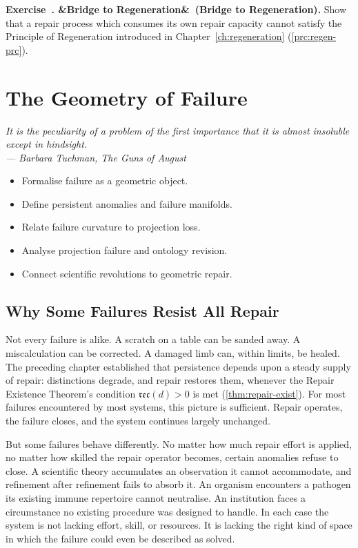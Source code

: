 \documentclass[12pt,twoside,openright]{book}
\newcommand{\reco}{\mathfrak{rec}}
\newenvironment{epigraph}[2]{%
  \vspace{1em}\begin{flushright}
  \begin{minipage}{0.72\textwidth}
  \itshape\small #1\\[0.4em]
  \upshape\footnotesize\sffamily\color{DistGray}--- #2
  \end{minipage}\end{flushright}\vspace{1.5em}}{}
\newenvironment{objectives}{%
  \begin{tcolorbox}[colback=DistBlue!5,colframe=DistBlue,
    title={\faCheckCircle\enspace Learning Objectives},
    fonttitle=\sffamily\bfseries\color{white},
    attach boxed title to top left={yshift=-2mm,xshift=4mm},
    boxed title style={colback=DistBlue},breakable]
  \begin{itemize}[leftmargin=*,nosep]}{%
  \end{itemize}\end{tcolorbox}\vspace{1em}}
\newcounter{exercise}[chapter]
\newenvironment{exercise}[1][]{%
  \refstepcounter{exercise}%
  \noindent\textbf{\sffamily\color{DistBlue}%
  Exercise~\thechapter.\theexercise%
  \ifx&#1&\else~(#1)\fi.}\enspace}{\par\medskip}
\begin{document}
\begin{exercise}[Bridge to Regeneration]
  Show that a repair process which consumes its own repair
  capacity cannot satisfy the Principle of Regeneration
  introduced in Chapter~\ref{ch:regeneration}
  (\cref{prc:regen-prc}).
\end{exercise}

\chapter{The Geometry of Failure}
\label{ch:geometry-failure}
\begin{epigraph}{It is the peculiarity of a problem of the
  first importance that it is almost insoluble except in
  hindsight.}%
  {Barbara Tuchman, \textit{The Guns of August}}
\end{epigraph}

\begin{objectives}
  \item Formalise failure as a geometric object.
  \item Define persistent anomalies and failure manifolds.
  \item Relate failure curvature to projection loss.
  \item Analyse projection failure and ontology revision.
  \item Connect scientific revolutions to geometric repair.
\end{objectives}

\section{Why Some Failures Resist All Repair}
\label{sec:ch8-why-failures-resist}

Not every failure is alike. A scratch on a table can be
sanded away. A miscalculation can be corrected. A damaged
limb can, within limits, be healed. The preceding chapter
established that persistence depends upon a steady supply
of repair: distinctions degrade, and repair restores them,
whenever the Repair Existence Theorem's condition
$\reco(d)>0$ is met (\cref{thm:repair-exist}). For most
failures encountered by most systems, this picture is
sufficient. Repair operates, the failure closes, and the
system continues largely unchanged.

But some failures behave differently. No matter how much
repair effort is applied, no matter how skilled the repair
operator becomes, certain anomalies refuse to close. A
scientific theory accumulates an observation it cannot
accommodate, and refinement after refinement fails to
absorb it. An organism encounters a pathogen its existing
immune repertoire cannot neutralise. An institution faces a
circumstance no existing procedure was designed to handle.
In each case the system is not lacking effort, skill, or
resources. It is lacking the right kind of space in which
the failure could even be described as solved.
\end{document}
